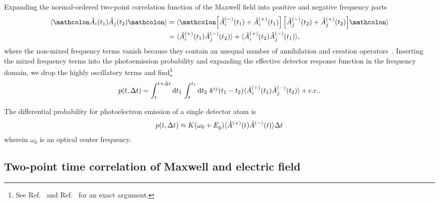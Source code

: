 Expanding the normal-ordered two-point correlation function of the Maxwell field into positive and negative frequency parts
\begin{equation}
	\begin{split}
		\expval{
			\norder{
				\hat{A}_i(t_1)
				\hat{A}_j(t_2)
			}
		}
		&=
		\expval{
			\norder{
				\left[
					\hat{A}_i^{(-)}(t_1)
					+
					\hat{A}_i^{(+)}(t_1)
				\right]
				\left[
					\hat{A}_j^{(-)}(t_2)
					+
					\hat{A}_j^{(+)}(t_2)
				\right]
			}
		}
		\\
		&=
		\expval{
			\hat{A}_i^{(+)}(t_1)
			\hat{A}_j^{(-)}(t_2)
		}
		+
		\expval{
			\hat{A}_i^{(+)}(t_2)
			\hat{A}_j^{(-)}(t_1)
		}
		,
	\end{split}
\end{equation}
where the non-mixed frequency terms vanish because they contain an unequal number of annihilation and creation operators~\cite[p.~134]{Cohen1992}.
Inserting the mixed frequency terms into the photoemission probability and expanding the effective detector response function in the frequency domain, we drop the highly oscillatory terms and find\footnote{See Ref.~\cite[p.~697]{Mandel1995} and Ref.~\cite[p.~136]{Cohen1992} for an exact argument.}
\begin{equation}
	p(t,\Delta t)
	=
	\int_t^{t+\Delta t}\dd{t_1}
	\int_t^{t_1}
	\dd{t_2}
	k^{ij}(t_1-t_2)
	\expval{
		\hat{A}_i^{(+)}(t_1)
		\hat{A}_j^{(-)}(t_2)
	}
	+
	\text{c.c.}
	.
\end{equation}



The differential probability for photoelectron emission of a single detector atom is~\cite{Kimble1984}
\begin{equation}
	p(t,\Delta t)
	\approx
	K(\omega_0+E_g)
	\langle
		\hat{A}^{(+)}(t)
		\hat{A}^{(-)}(t)
	\rangle
	\Delta t
	\label{eq:differential_photoemission_probability}
\end{equation}
wherein $\omega_0$ is an optical center frequency.

\subsection{Two-point time correlation of Maxwell and electric field}

